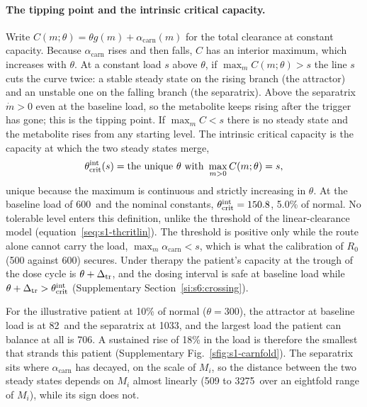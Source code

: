 \paragraph{The tipping point and the intrinsic critical capacity.} Write
$C(m;\theta)=\theta g(m)+\alpha_{\mathrm{carn}}(m)$ for the total clearance at constant
capacity. Because $\alpha_{\mathrm{carn}}$ rises and then falls, $C$ has an interior
maximum, which increases with $\theta$. At a constant load $s$ above $\theta$, if
$\max_m C(m;\theta)>s$ the line $s$ cuts the curve twice: a stable steady state on the rising branch (the
attractor) and an unstable one on the falling branch (the separatrix). Above the separatrix
$\dot m>0$ even at the baseline load, so the metabolite keeps rising after the trigger has
gone; this is the tipping point. If $\max_m C<s$ there is no steady state and the
metabolite rises from any starting level. The intrinsic critical capacity is the capacity at
which the two steady states merge,
\begin{equation}
\label{seq:s1-thcint}
\theta_{\mathrm{crit}}^{\mathrm{int}}(s)=\text{the unique }\theta\text{ with }\max_{m>0}C(m;\theta)=s ,
\end{equation}
unique because the maximum is continuous and strictly increasing in $\theta$. At the
baseline load of 600\um\ and the nominal constants, $\theta_{\mathrm{crit}}^{\mathrm{int}}=150.8$\um, 5.0\% of normal. No
tolerable level enters this definition, unlike the threshold of the linear-clearance model
(equation~\eqref{seq:s1-thcritlin}). The threshold is positive only while the route alone
cannot carry the load, $\max_m\alpha_{\mathrm{carn}}<s$, which is what the calibration of
$R_0$ (500 against 600) secures. Under therapy the patient's capacity at the trough of the
dose cycle is $\theta+\Delta_{\mathrm{tr}}$, and the dosing interval is safe at baseline load while
$\theta+\Delta_{\mathrm{tr}}>\theta_{\mathrm{crit}}^{\mathrm{int}}$ (Supplementary Section~\ref{si:s6:crossing}).

For the illustrative patient at 10\% of normal ($\theta=300$\um), the attractor at baseline
load is at 82\uM\ and the separatrix at 1033\uM, and the largest load the patient can
balance at all is 706\um. A sustained rise of 18\% in the load is therefore the smallest
that strands this patient (Supplementary Fig.~\ref{sfig:s1-carnfold}). The separatrix sits
where $\alpha_{\mathrm{carn}}$ has decayed, on the scale of $M_i$, so the distance between
the two steady states depends on $M_i$ almost linearly (509 to 3275\uM\ over an eightfold
range of $M_i$), while its sign does not.

